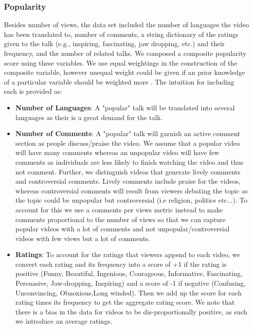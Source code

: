 \subsubsection{Popularity}
Besides number of views, the data set included the number of languages the video has been translated to, number of comments, a string dictionary of the ratings given to the talk (e.g., inspiring, fascinating, jaw dropping, etc.) and their frequency, and the number of related talks. We composed a composite popularity score using these variables. We use equal weightings in the construction of the composite variable, however unequal weight could be given if an prior knowledge of a particular variable should be weighted more \cite{song2013composite}. The intuition for including each is provided as:
\begin{itemize}
	\item \textbf{Number of Languages}: A "popular" talk will be translated into several languages as their is a great demand for the talk.
	\item \textbf{Number of Comments}: A "popular" talk will garnish an active comment section as people discuss/praise the video. We assume that a popular video will have many comments whereas an unpopular video will have few comments as individuals are less likely to finish watching the video and thus not comment. Further, we distinguish videos that generate lively comments and controversial comments. Lively comments include praise for the videos, whereas controversial comments will result from viewers debating the topic as the topic could be unpopular but controversial (i.e religion, politics etc...). To account for this we use a comments per views metric instead to make comments proportional to the number of views so that we can capture popular videos with a lot of comments and not unpopular/controversial videos with few views but a lot of comments. 
	\item \textbf{Ratings}: To account for the ratings that viewers append to each video, we convert each rating and its frequency into a score of +1 if the rating is positive (Funny, Beautiful, Ingenious, Courageous, Informative, 
	Fascinating, Persuasive,
	Jaw-dropping, Inspiring) and a score of -1 if negative (Confusing, Unconvincing, Obnoxious,Long winded). Then we add up the score for each rating times its frequency to get the aggregate rating score. We note that there is a bias in the data for videos to be dis-proportionally positive, as such we introduce an average ratings.

\end{itemize}
